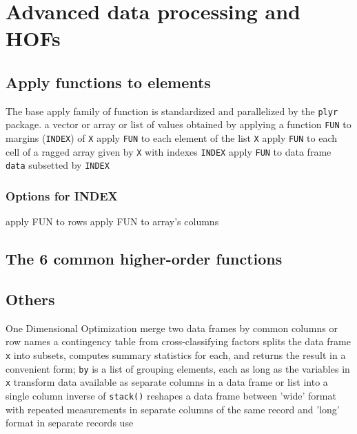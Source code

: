\section{Advanced data processing and HOFs}{}
\subsection{Apply functions to elements}{The base apply family of function is
    standardized and parallelized by the {\tt plyr} package.}
	{a vector or array or list of values obtained by applying a function {\tt FUN} to margins ({\tt INDEX}) of {\tt X}}
	{apply {\tt FUN} to each element of the list {\tt X}}
	{apply {\tt FUN} to each cell of a ragged array given by {\tt X} with indexes {\tt INDEX}}
	{apply {\tt FUN} to data frame {\tt data} subsetted by {\tt INDEX}}
\subsubsection{Options for INDEX}
	{apply FUN to rows}
	{apply FUN to array's columns}

\subsection{The 6 common higher-order functions}{}

\subsection{Others}{}
	{One Dimensional Optimization}
	{merge two data frames by com\-mon col\-umns or row names}
	{a contingency table from cross-classi\-fy\-ing factors}
	{splits the data frame {\tt x} into subsets, computes summary statistics for each, and returns the result in a convenient form; {\tt by} is a list of grouping elements, each as long as the variables in {\tt x}}
	{transform data available as se\-pa\-rate col\-umns in a data frame or list into a single column}
	{inverse of {\tt stack()}}
	{reshapes a data frame between 'wide' format
    with re\-pea\-ted mea\-sure\-ments in separate
    columns of the same record and 'long' format in separate records}
	{use}


